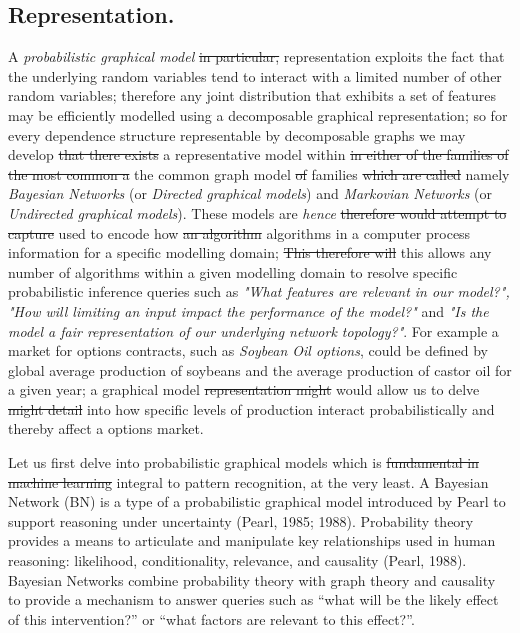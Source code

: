 \documentclass[7pt]{article}
\begin{document}
\subsection{Representation.}
A \emph{probabilistic graphical model} \st{in particular,} representation exploits the fact that the underlying random variables tend to interact with a limited number of other random variables; therefore any joint distribution that exhibits a set of features may be efficiently modelled using a decomposable graphical representation; so for every dependence structure representable by decomposable graphs we may develop \st{that there exists} a representative model within \st{in either of the families of the most common a} the common graph model \st{of} families \st{which are called} namely  \emph{Bayesian Networks}  (or \emph{Directed graphical models}) and \emph{Markovian Networks}  (or \emph{Undirected graphical models}). These models are \emph{hence} \st{therefore would attempt to capture} used to encode how \st{an algorithm} algorithms in a computer process information for a specific modelling domain; \st{This therefore will} this allows any number of algorithms within a given modelling domain to resolve specific probabilistic inference queries such as \emph{"What features are relevant in our model?", "How will limiting an input impact the performance of the model?"} and \emph{"Is the model a fair representation of our underlying network topology?"}.  For example a market for options contracts, such as \emph{Soybean Oil options}, could be defined by global average production of soybeans and the average production of castor oil for a given year; a graphical model \st{representation might} would allow us to delve \st{might detail} into how specific levels of production interact probabilistically and thereby affect a options market.

Let us first delve into probabilistic graphical models which is \st{fundamental in machine learning} integral to pattern recognition, at the very least. A Bayesian Network (BN) is a type of a probabilistic graphical model introduced by Pearl to support reasoning under uncertainty (Pearl, 1985; 1988). Probability theory provides a means to articulate and manipulate key relationships used in human reasoning: likelihood, conditionality, relevance, and causality (Pearl, 1988). Bayesian Networks combine probability theory with graph theory and causality to provide a mechanism to answer queries such as “what will be the likely effect of this intervention?” or “what factors are relevant to this effect?”. 
\end{document}

